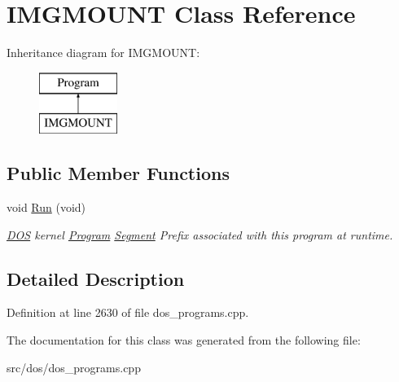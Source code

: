 \hypertarget{classIMGMOUNT}{\section{I\-M\-G\-M\-O\-U\-N\-T Class Reference}
\label{classIMGMOUNT}
}
Inheritance diagram for I\-M\-G\-M\-O\-U\-N\-T\-:\begin{figure}[H]
\begin{center}
\leavevmode
\includegraphics[height=2.000000cm]{classIMGMOUNT}
\end{center}
\end{figure}
\subsection*{Public Member Functions}
\begin{DoxyCompactItemize}
\item 
\hypertarget{classIMGMOUNT_abd99efa1dffda2e6f5640ebcd4781852}{void \hyperlink{classIMGMOUNT_abd99efa1dffda2e6f5640ebcd4781852}{Run} (void)}\label{classIMGMOUNT_abd99efa1dffda2e6f5640ebcd4781852}

\begin{DoxyCompactList}\small\item\em \hyperlink{classDOS}{D\-O\-S} kernel \hyperlink{classProgram}{Program} \hyperlink{structSegment}{Segment} Prefix associated with this program at runtime. \end{DoxyCompactList}\end{DoxyCompactItemize}


\subsection{Detailed Description}


Definition at line 2630 of file dos\-\_\-programs.\-cpp.



The documentation for this class was generated from the following file\-:\begin{DoxyCompactItemize}
\item 
src/dos/dos\-\_\-programs.\-cpp\end{DoxyCompactItemize}
